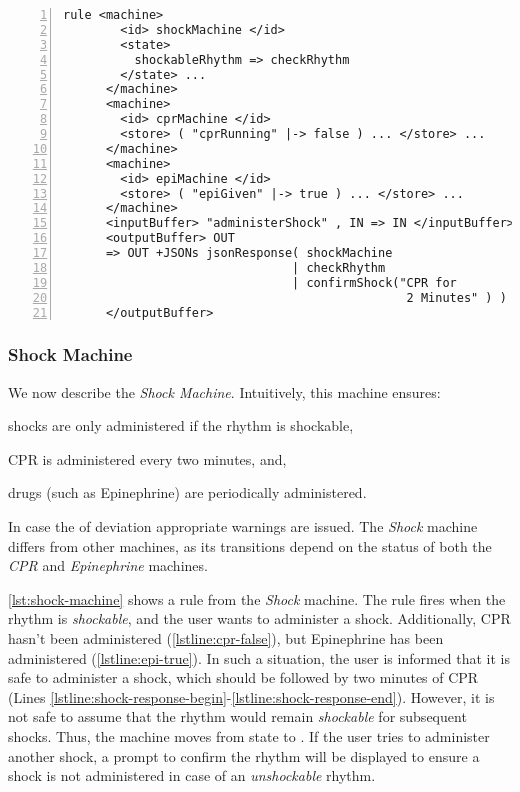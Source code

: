 \begin{lstlisting}[float=b!,
  frame=single,
  style=ksty,
  language=k,
  numbers=left,
  numbersep=5pt,
  caption={Shock Machine in $\K$},
  label={lst:shock-machine},
  xleftmargin=3ex
]
rule <machine>
        <id> shockMachine </id>
        <state>
          shockableRhythm => checkRhythm                         @\label{lstline:shock-state}@
        </state> ...
      </machine>
      <machine>
        <id> cprMachine </id>
        <store> ( "cprRunning" |-> false ) ... </store> ...      @\label{lstline:cpr-false}@
      </machine>
      <machine>
        <id> epiMachine </id>
        <store> ( "epiGiven" |-> true ) ... </store> ...        @\label{lstline:epi-true}@
      </machine>
      <inputBuffer> "administerShock" , IN => IN </inputBuffer>
      <outputBuffer> OUT                                        @\label{lstline:shock-response-begin}@
      => OUT +JSONs jsonResponse( shockMachine
                                | checkRhythm
                                | confirmShock("CPR for
                                                2 Minutes" ) )  @\label{lstline:shock-response-end}@
      </outputBuffer>
\end{lstlisting}

\subsubsection{Shock Machine}

We now describe the \textit{Shock Machine}. Intuitively, this
machine ensures:
\begin{enumerate*}[label=(\alph*)]
  \item shocks are only administered if the rhythm is shockable,
  \item CPR is administered every two minutes, and,
  \item drugs (such as Epinephrine) are periodically administered.
\end{enumerate*}
In case the of deviation appropriate warnings are issued. The \textit{Shock}
machine differs from other machines, as its transitions depend
on the status of both the \textit{CPR} and \textit{Epinephrine} machines.

\autoref{lst:shock-machine} shows a rule from the \textit{Shock} machine.
The rule fires when the rhythm is \textit{shockable}, and the user
wants to administer a shock. Additionally, CPR hasn't been administered
(\autoref{lstline:cpr-false}), but
Epinephrine has been administered (\autoref{lstline:epi-true}).
In such a situation, the user is informed that it is safe to
administer a shock, which should be followed by
two minutes of CPR (Lines
\ref{lstline:shock-response-begin}-\ref{lstline:shock-response-end}).
However, it is not safe to assume that the rhythm would remain
\textit{shockable} for subsequent shocks. Thus, the machine moves from
state  to . If the
user tries to administer another shock, a prompt to confirm the rhythm will be
displayed to ensure a shock is not administered in case of an \emph{unshockable}
rhythm.

